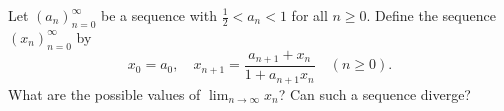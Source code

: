 \documentclass{article}
\begin{document}
\setlength{\parindent}{0pt}
Let $(a_{n})_{n=0}^{\infty}$ be a sequence with $\frac12<a_{n}<1$ for all $n\ge0$. Define the sequence $(x_{n})_{n=0}^{\infty}$ by$$x_{0}=a_{0},\quad x_{n+1}=\frac{a_{n+1}+x_{n}}{1+a_{n+1}x_{n}}\quad(n\ge0).$$What are the possible values of $\lim_{n\to\infty}x_{n}$? Can such a sequence diverge?
\end{document}
